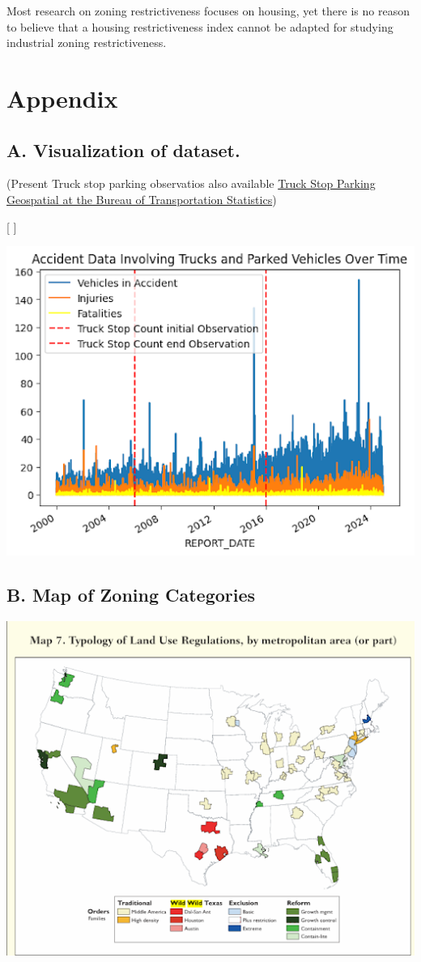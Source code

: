 \documentclass[
  12pt]{article}
\begin{document}
Most research on zoning restrictiveness focuses on housing, yet there is
no reason to believe that a housing restrictiveness index cannot be
adapted for studying industrial zoning restrictiveness.

\section{\texorpdfstring{\textbf{Appendix}}{Appendix}}\label{appendix}

\subsection{\texorpdfstring{\textbf{A. Visualization of
dataset.}}{A. Visualization of dataset.}}\label{sec-a.-visualization-of-dataset.-}

(Present Truck stop parking observatios also available
\href{https://data-usdot.opendata.arcgis.com/datasets/usdot::truck-stop-parking/about}{Truck
Stop Parking \textbar{} Geospatial at the Bureau of Transportation
Statistics})

{[} \citet{coWilliamClintCResearchProposalTrucks2024}{]}

\includegraphics{images/unnamed.png}

\subsection{B. Map of Zoning
Categories}\label{sec-b.-map-of-zoning-categories}

\includegraphics{images/unnamed (1).png}


  
\end{document}
